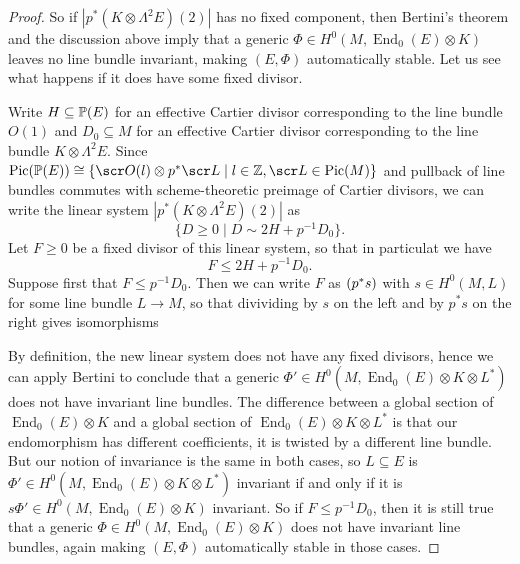 \documentclass[A4paper, 12pt, british, reqno]{amsart}
\DeclareMathOperator{\End}{End}
\DeclareMathOperator{\Pic}{Pic}
\let\div\relax
\DeclareMathOperator{\div}{div}
\newcommand{\ot}{\otimes}
\newcommand{\dual}{^{*}}
\begin{document}
\begin{prop}
\begin{proof}
	So if $|p^{*}(K\ot \Lambda^{2}E)(2)|$ has no fixed component, then Bertini's theorem and the discussion above imply that a generic $\Phi\in H^{0}(M,\End_{0}(E)\ot K)$ leaves no line bundle invariant, making $(E,\Phi)$ automatically stable.
	Let us see what happens if it does have some fixed divisor.

	Write $H\subseteq \P(E)$ for an effective Cartier divisor corresponding to the line bundle $O(1)$ and $D_{0}\subseteq M$ for an effective Cartier divisor corresponding to the line bundle $K\ot \Lambda^{2}E$.
	Since $\Pic(\P(E))\cong \{ \O(l)\ot p^{*}\L \mid l\in \Z, \L\in \Pic(M)\}$ \cite[Exercise II.7.9]{har77} and pullback of line bundles commutes with scheme-theoretic preimage of Cartier divisors, we can write the linear system $|p^{*}(K\ot \Lambda^{2}E)(2)|$ as
	\[ \{ D\geqslant 0 \mid D\sim 2H+p^{-1}D_{0}\}. \]
	Let $F\geqslant 0$ be a fixed divisor of this linear system, so that in particulat we have
	\[ F\leqslant 2H+p^{-1}D_{0}. \]
	Suppose first that $F\leqslant p^{-1}D_{0}$.
	Then we can write $F$ as $\div(p^{*}s)$ with $s\in H^{0}(M,L)$ for some line bundle $L\to M$, so that divividing by $s$ on the left and by $p^{*}s$ on the right gives isomorphisms
	\begin{center}
	\end{center}
	By definition, the new linear system does not have any fixed divisors, hence we can apply Bertini to conclude that a generic $\Phi'\in H^{0}(M,\End_{0}(E)\ot K\ot L\dual)$ does not have invariant line bundles.
	The difference between a global section of $\End_{0}(E)\ot K$ and a global section of $\End_{0}(E)\ot K\ot L\dual$ is that our endomorphism has different coefficients, it is twisted by a different line bundle.
	But our notion of invariance is the same in both cases, so $L\subseteq E$ is $\Phi'\in H^{0}(M,\End_{0}(E)\ot K\ot L\dual)$ invariant if and only if it is $s\Phi'\in H^{0}(M,\End_{0}(E)\ot K)$ invariant.
	So if $F\leqslant p^{-1}D_{0}$, then it is still true that a generic $\Phi\in H^{0}(M,\End_{0}(E)\ot K)$ does not have invariant line bundles, again making $(E,\Phi)$ automatically stable in those cases.
    \end{proof}
\end{prop}



\vspace{0.3cm}
\end{document}
